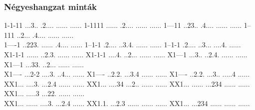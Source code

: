 
 
\pagestyle{empty}

\vspace*{\fill}
\subsubsection*{Négyeshangzat minták}
           {1-1-11%
            ...3..%
            .2....%
            ......%
            ......} 
           {1-1111%
            ......%
            .2....%
            ......%
            ......} 
           {1---11%
            ..23..%
            .4....%
            ......%
            ......} 
           {1--111%
            ..2...%
            .4....%
            ......%
            ......}\\
           {1----1%
            ..223.%
            ......%
            .4....%
            ......} 
           {1--1-1%
            .2....%
            ..3.4.%
            ......%
            ......} 
           {1--1-1%
            .2....%
            ..3...%
            ....4.%
            ......}\\
           {X1-1-1%
            ......%
            ..2.3.%
            ......%
            ......} 
           {X1-1-1%
            ....4.%
            ..2...%
            ......%
            ......} 
           {X1---1%
            ...3..%
            ..2.4.%
            ......%
            ......} 
           {X1---1%
            ...33.%
            ..2...%
            ......%
            ......}\\
           {X1----%
            ...2-2%
            ....3.%
            ..4...%
            ......} 
           {X1----%
            ..2.2.%
            ...3.4%
            ......%
            ......} 
           {X1----%
            ..2.2.%
            ...3..%
            .....4%
            ......}\\
           {XX1...%
            ....3.%
            ...2.4%
            ......%
            ......} 
           {XX1...%
            ....34%
            ...2..%
            ......%
            ......} 
           {XX1...%
            ......%
            ...234%
            ......%
            ......} 
           {XX1...%
            .....3%
            ...22.%
            ......%
            ......}\\
           {XX1...%
            ......%
            ....3.%
            ...2.4%
            ......} 
           {XX1.1.%
            ...2.3%
            ......%
            ......%
            ......} 
           {XX1...%
            ...234%
            ......%
            ......%
            ......}
\vspace*{\fill}


